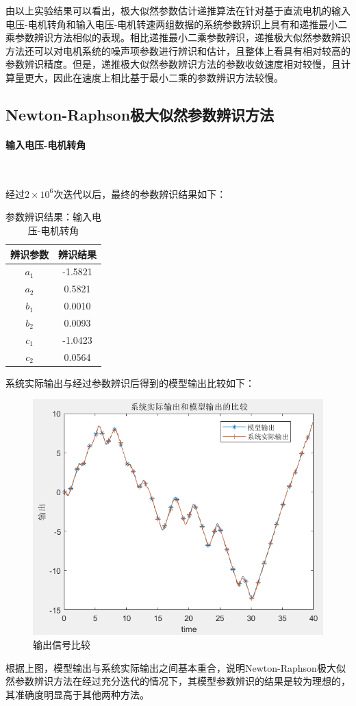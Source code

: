 \documentclass[UTF8, twocolumn]{article}
\begin{document}
由以上实验结果可以看出，极大似然参数估计递推算法在针对基于直流电机的输入电压-电机转角和输入电压-电机转速两组数据的系统参数辨识上具有和递推最小二乘参数辨识方法相似的表现。相比递推最小二乘参数辨识，递推极大似然参数辨识方法还可以对电机系统的噪声项参数进行辨识和估计，且整体上看具有相对较高的参数辨识精度。但是，递推极大似然参数辨识方法的参数收敛速度相对较慢，且计算量更大，因此在速度上相比基于最小二乘的参数辨识方法较慢。

\subsection{Newton-Raphson极大似然参数辨识方法}
\paragraph{输入电压-电机转角}~{}

经过$2 \times 10^6$次迭代以后，最终的参数辨识结果如下：
\begin{table}[H] %
\centering %
\begin{tabular}{cc} %
	\toprule %
	辨识参数 & 辨识结果 \\
	\midrule %
	$a_1$ & -1.5821 \\
	$a_2$ & 0.5821 \\
	$b_1$ & 0.0010 \\
	$b_2$ & 0.0093 \\
	$c_1$ & -1.0423 \\
	$c_2$ & 0.0564 \\
	\bottomrule %
\end{tabular}
\caption{参数辨识结果：输入电压-电机转角} %
\end{table}

系统实际输出与经过参数辨识后得到的模型输出比较如下：
\begin{figure}[H]
    \centering %
    \includegraphics[width=.4\textwidth]{figure/newton-输出比较.png} 
    \caption{输出信号比较} %
\end{figure}
根据上图，模型输出与系统实际输出之间基本重合，说明Newton-Raphson极大似然参数辨识方法在经过充分迭代的情况下，其模型参数辨识的结果是较为理想的，其准确度明显高于其他两种方法。
\end{document}
